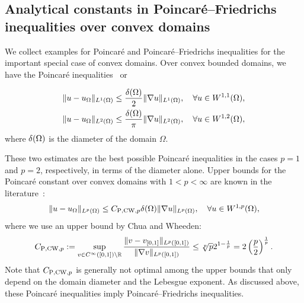 \documentclass[10pt,letterpaper]{article}
\newcommand\cye[1]{%
  \protect\leavevmode
  \begingroup
    \color{red!35!yellow}%
    #1%
  \endgroup
}
\begin{document}
\subsection{\cye{Analytical constants in} Poincar\'e--Friedrichs inequalities over convex domains} \label{section: PX_convex}

We collect examples for Poincar\'e and Poincar\'e--Friedrichs inequalities for the important special case of convex domains. 
Over convex bounded domains, we have the Poincar\'e inequalities~\cite{Pay_Wei_Poin_conv_60,bebendorf2003note,acosta2004optimal} \cye{or \cite[Lemma~3.24]{ern2021finite}} 
\begin{align}\label{math:acostaduran}
    \| u - u_{\Omega} \|_{L^{1}(\Omega)}
    \leq 
    \frac{{\delta}(\Omega)}{2}
    \| \nabla u \|_{L^{1}(\Omega)}
    ,
    \quad 
    \forall 
    u \in W^{1,1}(\Omega)
    ,
    \\
    \| u - u_{\Omega} \|_{L^{2}(\Omega)} \label{math:bebendorf}
    \leq 
    \frac{{\delta}(\Omega)}{\pi}
    \| \nabla u \|_{L^{2}(\Omega)}
    ,
    \quad 
    \forall 
    u \in W^{1,2}(\Omega)
    ,
\end{align}
\cye{where ${\delta}(\Omega)$ is the diameter of the domain $\Omega$.}
These two estimates are the best possible Poincar\'e inequalities in the cases $p=1$ and $p=2$, respectively, in terms of the diameter alone. 
Upper bounds for the Poincar\'e constant over convex domains with $1 < p < \infty$ are known in the literature~\cite[Theorem~1.1, Theorem~1.2]{chua2006estimates}:
\begin{align}\label{math:chuawheeden}
    \| u - u_{\Omega} \|_{L^{p}(\Omega)}
    \leq 
    C_{{\rm P},{\rm CW},p}
    {\delta}(\Omega)
    \| \nabla u \|_{L^{p}(\Omega)}
    ,
    \quad 
    \forall 
    u \in W^{1,p}(\Omega)
    ,
\end{align}
where we use an upper bound by Chua and Wheeden:
\begin{align*}
    C_{{\rm P},{\rm CW},p} 
    := 
    \sup\limits_{ v \in C^\infty([0,1]) \setminus {\mathbb R} } 
    \frac{ 
        \| v - v_{[0,1]} \|_{L^{p}([0,1])} 
    }{ 
        \| \nabla v \|_{L^{p}([0,1])} 
    }
    \leq 
    \sqrt[p]{p} 2^{1-\frac 1 p}
    =
    2
    \left( \frac p 2 \right)^{\frac 1 p}
    .
\end{align*} 
Note that $C_{{\rm P},{\rm CW},p}$ is generally not optimal among the upper bounds that only depend on the domain diameter and the Lebesgue exponent.
As discussed above, these Poincar\'e inequalities imply Poincar\'e--Friedrichs inequalities. 
\end{document}
